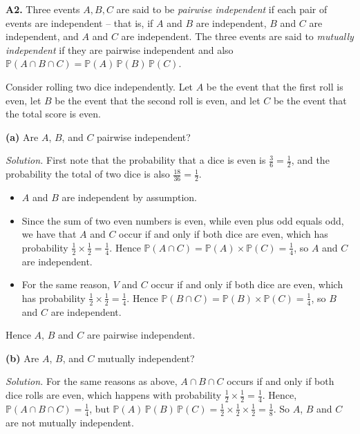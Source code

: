 \documentclass[
  a4paper,
]{book}
\providecommand{\tightlist}{%
  \setlength{\itemsep}{0pt}\setlength{\parskip}{0pt}}
\theoremstyle{definition}
\theoremstyle{definition}
\theoremstyle{definition}
\theoremstyle{definition}
\theoremstyle{remark}
\begin{document}
\textbf{A2.} Three events \(A, B, C\) are said to be \emph{pairwise independent} if each pair of events are independent -- that is, if \(A\) and \(B\) are independent, \(B\) and \(C\) are independent, and \(A\) and \(C\) are independent. The three events are said to \emph{mutually independent} if they are pairwise independent and also \(\mathbb P(A \cap B \cap C) = \mathbb P(A)\,\mathbb P(B)\,\mathbb P(C)\).

Consider rolling two dice independently. Let \(A\) be the event that the first roll is even, let \(B\) be the event that the second roll is even, and let \(C\) be the event that the total score is even.

\textbf{(a)} Are \(A\), \(B\), and \(C\) pairwise independent?

\begin{myanswers}
\emph{Solution.} First note that the probability that a dice is even is \(\frac{3}{6} = \frac12\), and the probability the total of two dice is also \(\frac{18}{36} = \frac12\).

\begin{itemize}
\tightlist
\item
  \(A\) and \(B\) are independent by assumption.
\item
  Since the sum of two even numbers is even, while even plus odd equals odd, we have that \(A\) and \(C\) occur if and only if both dice are even, which has probability \(\frac12 \times \frac12 = \frac14\). Hence \(\mathbb P(A \cap C) = \mathbb P(A) \times \mathbb P(C) = \frac14\), so \(A\) and \(C\) are independent.
\item
  For the same reason, \(V\) and \(C\) occur if and only if both dice are even, which has probability \(\frac12 \times \frac12 = \frac14\). Hence \(\mathbb P(B \cap C) = \mathbb P(B) \times \mathbb P(C) = \frac14\), so \(B\) and \(C\) are independent.
\end{itemize}

Hence \(A\), \(B\) and \(C\) are pairwise independent.

\end{myanswers}

\textbf{(b)} Are \(A\), \(B\), and \(C\) mutually independent?

\begin{myanswers}
\emph{Solution.}
For the same reasons as above, \(A \cap B \cap C\) occurs if and only if both dice rolls are even, which happens with probability \(\frac12\times\frac12 = \frac14\). Hence, \(\mathbb P(A \cap B \cap C) = \frac14\), but \(\mathbb P(A)\,\mathbb P(B)\,\mathbb P(C) = \frac12\times\frac12\times\frac12 = \frac18\). So \(A\), \(B\) and \(C\) are not mutually independent.

\end{myanswers}
\end{document}
